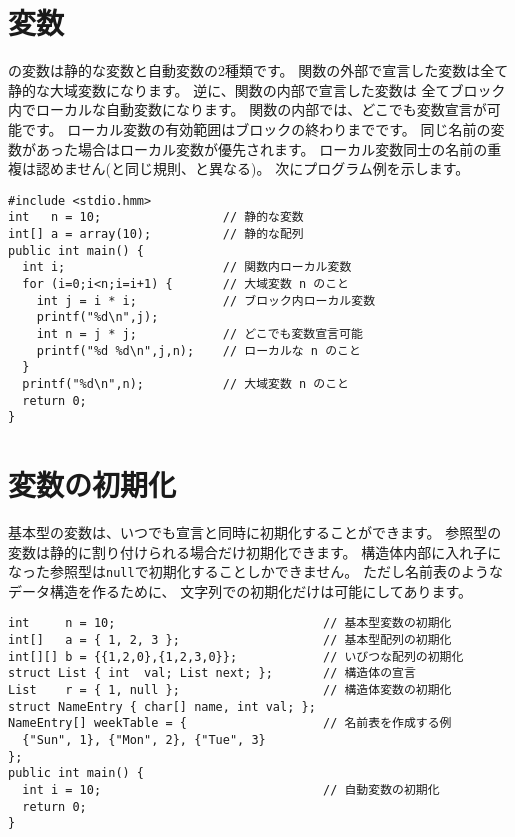 \section{変数}

\cmml の変数は静的な変数と自動変数の2種類です。
関数の外部で宣言した変数は全て静的な大域変数になります。
逆に、関数の内部で宣言した変数は
全てブロック内でローカルな自動変数になります。
関数の内部では、どこでも変数宣言が可能です。
ローカル変数の有効範囲はブロックの終わりまでです。
同じ名前の変数があった場合はローカル変数が優先されます。
ローカル変数同士の名前の重複は認めません(\javal と同じ規則、\cl と異なる)。
次にプログラム例を示します。

\begin{mylist}
\begin{verbatim}
#include <stdio.hmm>
int   n = 10;                 // 静的な変数
int[] a = array(10);          // 静的な配列
public int main() {
  int i;                      // 関数内ローカル変数
  for (i=0;i<n;i=i+1) {       // 大域変数 n のこと
    int j = i * i;            // ブロック内ローカル変数
    printf("%d\n",j);
    int n = j * j;            // どこでも変数宣言可能
    printf("%d %d\n",j,n);    // ローカルな n のこと
  }                        
  printf("%d\n",n);           // 大域変数 n のこと
  return 0;
}
\end{verbatim}
\end{mylist}

\section{変数の初期化}

基本型の変数は、いつでも宣言と同時に初期化することができます。
参照型の変数は静的に割り付けられる場合だけ初期化できます。
構造体内部に入れ子になった参照型は\verb/null/で初期化することしかできません。
ただし名前表のようなデータ構造を作るために、
文字列での初期化だけは可能にしてあります。

\begin{mylist}
\begin{verbatim}
int     n = 10;                             // 基本型変数の初期化
int[]   a = { 1, 2, 3 };                    // 基本型配列の初期化
int[][] b = {{1,2,0},{1,2,3,0}};            // いびつな配列の初期化
struct List { int  val; List next; };       // 構造体の宣言
List    r = { 1, null };                    // 構造体変数の初期化
struct NameEntry { char[] name, int val; };
NameEntry[] weekTable = {                   // 名前表を作成する例
  {"Sun", 1}, {"Mon", 2}, {"Tue", 3}
};
public int main() {
  int i = 10;                               // 自動変数の初期化
  return 0;
}
\end{verbatim}
\end{mylist}

